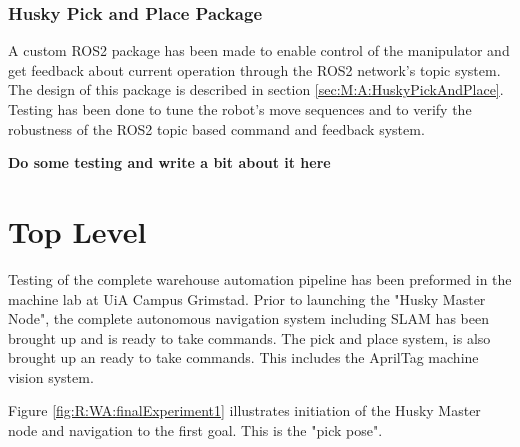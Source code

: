 \subsubsection{Husky Pick and Place Package}
A custom ROS2 package has been made to enable control of the manipulator and get feedback about current operation through the ROS2 network's topic system. The design of this package is described in section \ref{sec:M:A:HuskyPickAndPlace}. Testing has been done to tune the robot's move sequences and to verify the robustness of the ROS2 topic based command and feedback system. 

\textbf{Do some testing and write a bit about it here}

\section{Top Level}

Testing of the complete warehouse automation pipeline has been preformed in the machine lab at UiA Campus Grimstad. Prior to launching the "Husky Master Node", the complete autonomous navigation system including SLAM has been brought up and is ready to take commands. The pick and place system, is also brought up an ready to take commands. This includes the AprilTag machine vision system.

Figure \ref{fig:R:WA:finalExperiment1} illustrates initiation of the Husky Master node and navigation to the first goal. This is the "pick pose".


